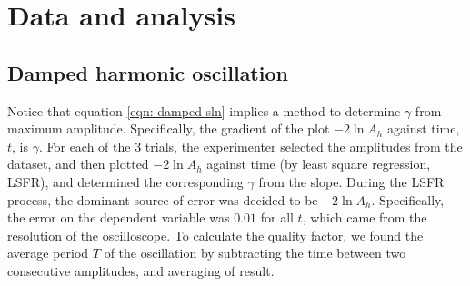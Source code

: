 \documentclass[a4paper,12pt]{article}
\begin{document}
\section{Data and analysis}
\subsection{Damped harmonic oscillation}
Notice that equation \ref{eqn: damped sln} implies a method to determine \( \gamma \) from maximum amplitude. Specifically, the gradient of the plot \( -2\ln A_h \) against time, \( t \), is \( \gamma \). For each of the 3 trials, the experimenter selected the amplitudes from the dataset, and then  plotted \( -2\ln A_h \) against time (by least square regression, LSFR), and determined the corresponding \( \gamma \) from the slope. During the LSFR process, the dominant source of error was decided to be \( -2\ln A_h \). Specifically, the error on the dependent variable was \( 0.01 \) for all \( t \), which came from the resolution of the oscilloscope. To calculate the quality factor, we found the average period \( T \) of the oscillation by subtracting the time between two consecutive amplitudes, and averaging of result. 
\end{document}
